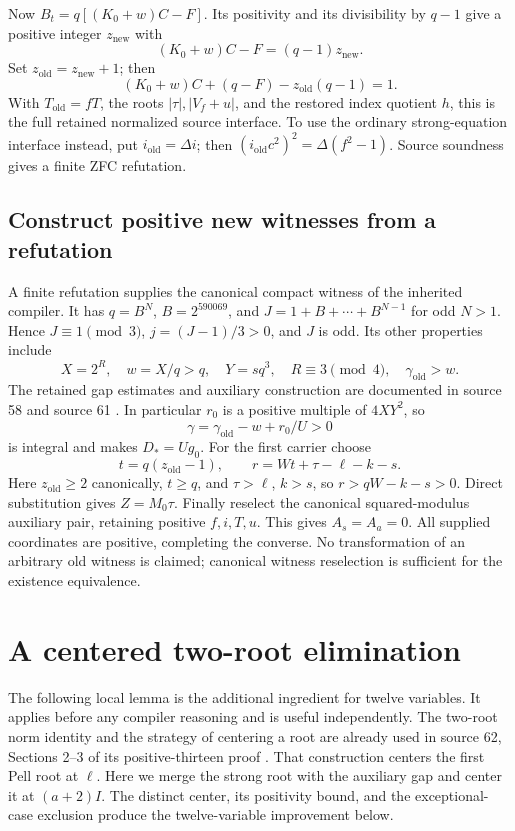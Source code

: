 \documentclass[11pt]{article}
\theoremstyle{remark}
\begin{document}
Now $B_t=q[(K_0+w)C-F]$. Its positivity and its divisibility by $q-1$
give a positive integer $z_{\mathrm{new}}$ with
\[
 (K_0+w)C-F=(q-1)z_{\mathrm{new}}.
\]
Set $z_{\mathrm{old}}=z_{\mathrm{new}}+1$; then
\[
 (K_0+w)C+(q-F)-z_{\mathrm{old}}(q-1)=1.
\]
With $T_{\mathrm{old}}=fT$, the roots $|\tau|,|V_f+u|$, and the
restored index quotient $h$, this is the full retained normalized source
interface. To use the ordinary strong-equation interface instead, put
$i_{\mathrm{old}}=\Delta i$; then
$(i_{\mathrm{old}}c^2)^2=\Delta(f^2-1)$.
Source soundness gives a finite ZFC refutation.

\subsection{Construct positive new witnesses from a refutation}

A finite refutation supplies the canonical compact witness of the inherited
compiler. It has $q=B^N$, $B=2^{590069}$, and
$J=1+B+\cdots+B^{N-1}$ for odd $N>1$. Hence $J\equiv1\pmod3$,
$j=(J-1)/3>0$, and $J$ is odd. Its other properties include
\[
 X=2^R,\quad w=X/q>q,\quad Y=sq^3,\quad R\equiv3\pmod4,
 \quad \gamma_{\mathrm{old}}>w.
\]
The retained gap estimates and auxiliary construction are documented in
source 58 and source 61 \cite{source58,source61}. In particular $r_0$ is
a positive multiple of $4XY^2$, so
\[
 \gamma=\gamma_{\mathrm{old}}-w+r_0/U>0
\]
is integral and makes $D_*=Ug_0$. For the first carrier choose
\[
 t=q(z_{\mathrm{old}}-1),\qquad
 r=Wt+\tau-\ell-k-s.
\]
Here $z_{\mathrm{old}}\ge2$ canonically, $t\ge q$, and
$\tau>\ell$, $k>s$, so
$r>qW-k-s>0$. Direct substitution gives $Z=M_0\tau$.
Finally reselect the canonical squared-modulus auxiliary pair, retaining
positive $f,i,T,u$. This gives $A_s=A_a=0$. All supplied coordinates are
positive, completing the converse. No transformation of an arbitrary old
witness is claimed; canonical witness reselection is sufficient for the
existence equivalence.

\section{A centered two-root elimination}
\label{sec:norm}

The following local lemma is the additional ingredient for twelve variables.
It applies before any compiler reasoning and is useful independently.
The two-root norm identity and the strategy of centering a root are already
used in source 62, Sections 2--3 of its positive-thirteen proof
\cite{source62}. That construction centers the first Pell root at $\ell$.
Here we merge the strong root with the auxiliary gap and center it at
$(a+2)I$. The distinct center, its positivity bound, and the exceptional-case
exclusion produce the twelve-variable improvement below.
\end{document}
